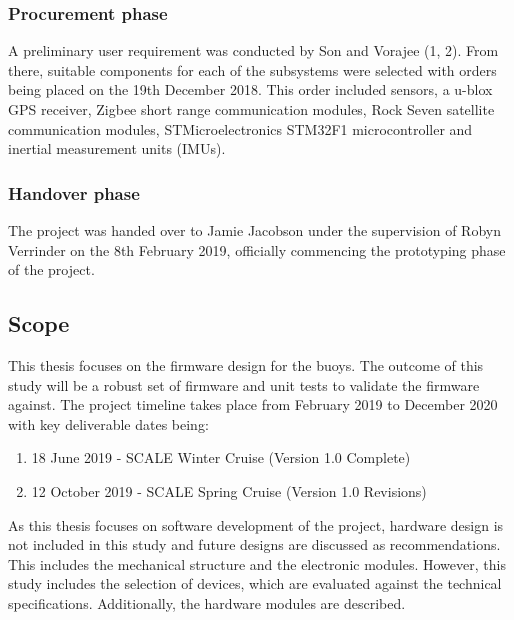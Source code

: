 \subsubsection{Procurement phase}

A preliminary user requirement was conducted by Son and Vorajee (1, 2). From there, suitable components for each of the subsystems were selected with orders being placed on the 19th December 2018. This order included sensors, a u-blox GPS receiver, Zigbee short range communication modules, Rock Seven satellite communication modules, STMicroelectronics STM32F1 microcontroller and inertial measurement units (IMUs).

\subsubsection{Handover phase}

The project was handed over to Jamie Jacobson under the supervision of Robyn Verrinder on the 8th February 2019, officially commencing the prototyping phase of the project.

\subsection{Scope}

This thesis focuses on the firmware design for the buoys. The outcome of this study will be a robust set of firmware and unit tests to validate the firmware against. The project timeline takes place from February 2019 to December 2020 with key deliverable dates being:

\begin{enumerate}
    \item 18 June 2019 - SCALE Winter Cruise  (Version 1.0 Complete)
    \item 12 October 2019 - SCALE Spring Cruise (Version 1.0 Revisions)
\end{enumerate}


As this thesis focuses on software development of the project, hardware design is not included in this study and future designs are discussed as recommendations. This includes the mechanical structure and the electronic modules. However, this study includes the selection of devices, which are evaluated against the technical specifications. Additionally, the hardware modules are described.\par 

